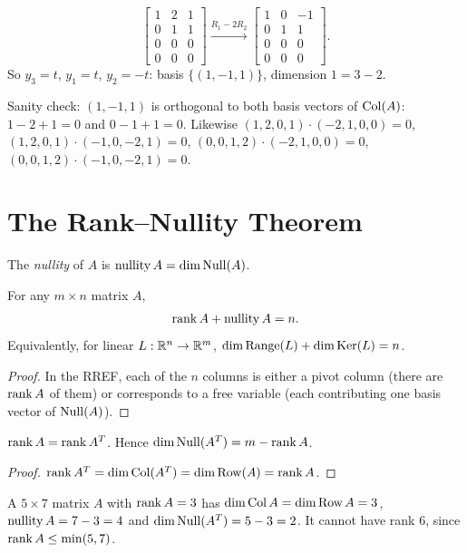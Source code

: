\begin{example}
\begin{itemize}
\[  \begin{bmatrix}1&2&1\\0&1&1\\0&0&0\\0&0&0\end{bmatrix}
  \xrightarrow{R_1-2R_2}
  \begin{bmatrix}1&0&-1\\0&1&1\\0&0&0\\0&0&0\end{bmatrix}.
  \]
  So $y_3=t$, $y_1=t$, $y_2=-t$: basis $\{(1,-1,1)\}$, dimension $1=3-2$.
\end{itemize}
Sanity check: $(1,-1,1)$ is orthogonal to both basis vectors of $\operatorname{Col}(A)$: $1-2+1=0$ and
$0-1+1=0$. Likewise $(1,2,0,1)\cdot(-2,1,0,0)=0$, $(1,2,0,1)\cdot(-1,0,-2,1)=0$,
$(0,0,1,2)\cdot(-2,1,0,0)=0$, $(0,0,1,2)\cdot(-1,0,-2,1)=0$.
\end{example}

\section{The Rank--Nullity Theorem}

\begin{definition}
The \emph{nullity} of $A$ is $\operatorname{nullity} A=\dim\operatorname{Null}(A)$.
\end{definition}

\begin{theorem}
For any $m\times n$ matrix $A$,
\[
  \operatorname{rank} A + \operatorname{nullity} A = n .
\]
Equivalently, for linear $L:\mathbb{R}^n\to\mathbb{R}^m$, $\dim\operatorname{Range}(L)+\dim\operatorname{Ker}(L)=n$.
\end{theorem}
\begin{proof}
In the RREF, each of the $n$ columns is either a pivot column (there are $\operatorname{rank} A$ of them) or
corresponds to a free variable (each contributing one basis vector of $\operatorname{Null}(A)$).
\end{proof}

\begin{theorem}
$\operatorname{rank} A = \operatorname{rank} A^T$. Hence $\dim\operatorname{Null}(A^T)=m-\operatorname{rank} A$.
\end{theorem}
\begin{proof}
$\operatorname{rank} A^T=\dim\operatorname{Col}(A^T)=\dim\operatorname{Row}(A)=\operatorname{rank} A$.
\end{proof}

\begin{example}
A $5\times 7$ matrix $A$ with $\operatorname{rank} A=3$ has $\dim\operatorname{Col} A=\dim\operatorname{Row} A=3$, $\operatorname{nullity} A=7-3=4$ and
$\dim\operatorname{Null}(A^T)=5-3=2$. It cannot have rank $6$, since $\operatorname{rank} A\le\min(5,7)$.
\end{example}

